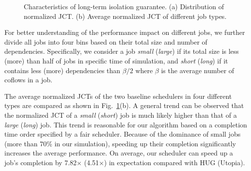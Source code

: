 \documentclass[10pt,journal,compsoc]{IEEEtran}
\begin{document}
\begin{figure}[!t]
	\centering
	\hfil
	\caption{Characteristics of long-term isolation guarantee. (a) Distribution of normalized JCT. (b) Average normalized JCT of different job types.}
	\label{f1}
\end{figure}

For better understanding of the performance impact on different jobs, we further divide all jobs into four bins based on their total size and number of dependencies.
%
Specifically, we consider a job \emph{small} (\emph{large}) if its total size is less (more) than half of jobs in specific time of simulation,
%
and \emph{short} (\emph{long}) if it contains less (more) dependencies than $\beta/2$ where $\beta$ is the average number of coflows in a job.

The average normalized JCTs of the two baseline schedulers in four different types are compared as shown in Fig.~\ref{f1}(b).
%
A general trend can be observed that the normalized JCT of a \emph{small} (\emph{short}) job is much likely higher than that of a \emph{large} (\emph{long}) job.
%
This trend is reasonable for our algorithm based on a completion time order specified by a fair scheduler.
%
Because of the dominance of small jobs (more than 70\% in our simulation), speeding up their completion significantly increases the average performance.
%
On average, our scheduler can speed up a job's completion by 7.82$\times$ (4.51$\times$) in expectation compared with HUG (Utopia).
\end{document}
